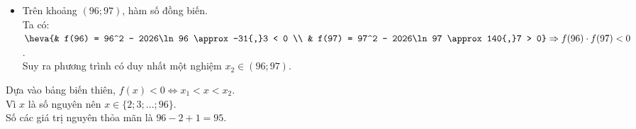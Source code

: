\begin{ex}
{\begin{itemchoice}
\begin{itemize}
				\item Trên khoảng $(96; 97)$, hàm số đồng biến.\\ Ta có:
				$\heva{& f(96) = 96^2 - 2026\ln 96 \approx -31{,}3 < 0 \\ & f(97) = 97^2 - 2026\ln 97 \approx 140{,}7 > 0} \Rightarrow f(96) \cdot f(97) < 0$.\\
				Suy ra phương trình có duy nhất một nghiệm $x_2 \in (96; 97)$.
			\end{itemize}
			Dựa vào bảng biến thiên, $f(x) < 0\Leftrightarrow x_1 < x < x_2$.\\
			Vì $x$ là số nguyên nên $x \in \{2; 3; \ldots; 96\}$.\\
			Số các giá trị nguyên thỏa mãn là $96 - 2 + 1 = 95$.
		\end{itemchoice}
	}
\end{ex}

